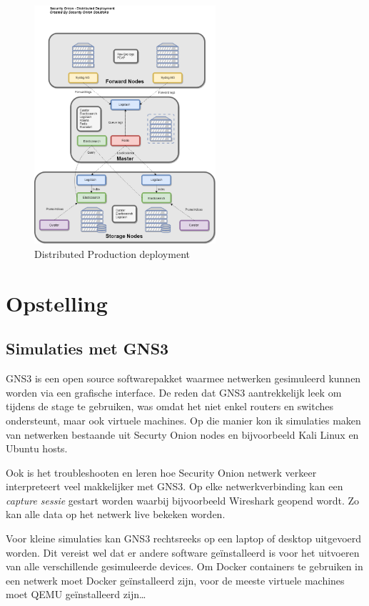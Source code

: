 \documentclass[a4paper,12pt]{report}
\begin{document}
\begin{figure}[H]
  \centering
  \includegraphics[width=0.6\textwidth]{so-architecture-production-distributed}
  \caption{Distributed Production deployment \autocite{so:docs}}
  \label{fig:so-architecture-distributed}
\end{figure}

\chapter{Opstelling}
\section{Simulaties met GNS3}
GNS3 is een open source softwarepakket waarmee netwerken gesimuleerd kunnen worden via een grafische interface.
De reden dat GNS3 aantrekkelijk leek om tijdens de stage te gebruiken, was omdat het niet enkel routers en switches ondersteunt, maar ook virtuele machines.
Op die manier kon ik simulaties maken van netwerken bestaande uit Securty Onion nodes en bijvoorbeeld Kali Linux en Ubuntu hosts.

Ook is het troubleshooten en leren hoe Security Onion netwerk verkeer interpreteert veel makkelijker met GNS3.
Op elke netwerkverbinding kan een \emph{capture sessie} gestart worden waarbij bijvoorbeeld Wireshark geopend wordt.
Zo kan alle data op het netwerk live bekeken worden.

Voor kleine simulaties kan GNS3 rechtsreeks op een laptop of desktop uitgevoerd worden.
Dit vereist wel dat er andere software geïnstalleerd is voor het uitvoeren van alle verschillende gesimuleerde devices. 
Om Docker containers te gebruiken in een netwerk moet Docker geïnstalleerd zijn, voor de meeste virtuele machines moet QEMU geïnstalleerd zijn\dots
\autocite{gns3:home}
\end{document}
